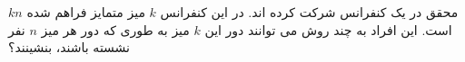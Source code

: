 \exercise
$kn$
محقق در یک کنفرانس شرکت کرده اند. در این کنفرانس
$k$
میز متمایز فراهم شده است. این افراد به چند روش می توانند دور این 
$k$
میز به طوری که دور هر میز 
$n$
نفر نشسته باشند، بنشینند؟